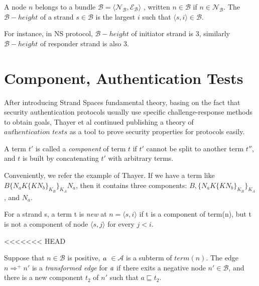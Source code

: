 \begin{Definition}
A node $n$ belongs to a bundle $\mathcal{B} = \langle \mathcal{N_B},\mathcal{E_B}\rangle$ , written $n \in \mathcal{B}$ if $n \in \mathcal{N_B}$. The $\mathcal{B} -height$ of a strand $s \in \mathcal{B}$ is the largest $i$ such that $\langle s,i \rangle \in \mathcal{B}$. 
\end{Definition}

For instance, in NS protocol, $\mathcal{B}-height$ of initiator strand is 3, similarly $\mathcal{B}-height$ of responder strand is also 3.

\section{Component, Authentication Tests}

After introducing Strand Spaces fundamental theory, basing on the fact that security authentication protocols usually use specific challenge-response methods to obtain goals, Thayer et al\cite{authenticationtests} continued publishing a theory of $\textit{authentication tests}$ as a tool to prove security properties for protocols easily. 

\begin{Definition}
 A term $t'$ is called a \emph{component} of term $t$ if $t'$ cannot be split to another term $t''$, and $t$ is built by concatenating $t'$ with arbitrary terms.
\end{Definition}

Conveniently, we refer the example of Thayer\cite{Thayer:2010aa}. If we have a term like $B\{N_aK\{KN_b\}_{K_B}\}_{K_A}N_a$, then it contains three components: $B, \{N_aK\{KN_b\}_{K_B}\}_{K_A}$, and $N_a$. 
 
\begin{Definition}
 For a strand s, a term t is \emph{new} at $n = \langle s,i\rangle$ if t is a component of term(n), but t is not a component of node $\langle s,j\rangle$ for every $j<i$. 
\end{Definition}

<<<<<<< HEAD
\begin{Definition} Suppose that $n \in \mathcal{B}$ is positive, $\emph{a}$ $\in \mathcal{A}$ is a subterm of $term(n)$. The edge $n \Rightarrow^+ n'$ is a \emph{transformed edge} for $\emph{a}$ if there exits a negative node $n' \in \mathcal{B}$, and there is a new component $t_2$ of $n'$ such that $a \sqsubseteq t_2$.
\end{Definition}

